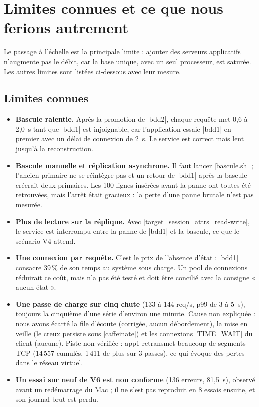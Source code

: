 \documentclass[a4paper,11pt]{article}
\begin{document}
\section{Limites connues et ce que nous ferions autrement}

Le passage à l'échelle est la principale limite : ajouter des serveurs applicatifs n'augmente pas le débit, car la base unique, avec un seul processeur, est saturée. Les autres limites sont listées ci-dessous avec leur mesure.

\subsection{Limites connues}
\begin{itemize}
  \item \textbf{Bascule ralentie.} Après la promotion de |bdd2|, chaque requête met 0,6 à 2,0~s tant que |bdd1| est injoignable, car l'application essaie |bdd1| en premier avec un délai de connexion de 2~s. Le service est correct mais lent jusqu'à la reconstruction.
  \item \textbf{Bascule manuelle et réplication asynchrone.} Il faut lancer |bascule.sh| ; l'ancien primaire ne se réintègre pas et un retour de |bdd1| après la bascule créerait deux primaires. Les 100 lignes insérées avant la panne ont toutes été retrouvées, mais l'arrêt était gracieux : la perte d'une panne brutale n'est pas mesurée.
  \item \textbf{Plus de lecture sur la réplique.} Avec |target_session_attrs=read-write|, le service est interrompu entre la panne de |bdd1| et la bascule, ce que le scénario V4 attend.
  \item \textbf{Une connexion par requête.} C'est le prix de l'absence d'état : |bdd1| consacre 39\,\% de son temps au système sous charge. Un pool de connexions réduirait ce coût, mais n'a pas été testé et doit être concilié avec la consigne « aucun état ».
  \item \textbf{Une passe de charge sur cinq chute} (133 à 144 req/s, p99 de 3 à 5~s), toujours la cinquième d'une série d'environ une minute. Cause non expliquée : nous avons écarté la file d'écoute (corrigée, aucun débordement), la mise en veille (le creux persiste sous |caffeinate|) et les connexions |TIME_WAIT| du client (aucune). Piste non vérifiée : app1 retransmet beaucoup de segments TCP (14\,557 cumulés, 1\,411 de plus sur 3 passes), ce qui évoque des pertes dans le réseau virtuel.
  \item \textbf{Un essai sur neuf de V6 est non conforme} (136 erreurs, 81,5~s), observé avant un redémarrage du Mac ; il ne s'est pas reproduit en 8 essais ensuite, et son journal brut est perdu.

\end{itemize}
\end{document}
